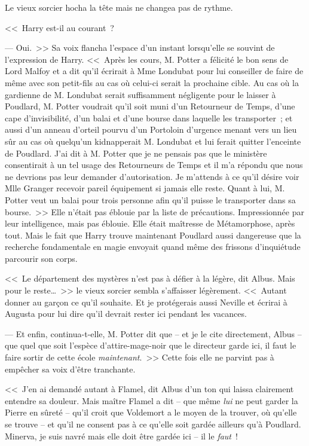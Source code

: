 Le vieux sorcier hocha la tête mais ne changea pas de rythme.

<<~Harry est-il au courant~?

--- Oui.~>> Sa voix flancha l'espace d'un instant lorsqu'elle se souvint de l'expression de Harry. <<~Après les cours, M. Potter a félicité le bon sens de Lord Malfoy et a dit qu'il écrirait à Mme Londubat pour lui conseiller de faire de même avec son petit-fils au cas où celui-ci serait la prochaine cible. Au cas où la gardienne de M. Londubat serait suffisamment négligente pour le laisser à Poudlard, M. Potter voudrait qu'il soit muni d'un Retourneur de Temps, d'une cape d'invisibilité, d'un balai et d'une bourse dans laquelle les transporter~; et aussi d'un anneau d'orteil pourvu d'un Portoloin d'urgence menant vers un lieu sûr au cas où quelqu'un kidnapperait M. Londubat et lui ferait quitter l'enceinte de Poudlard. J'ai dit à M. Potter que je ne pensais pas que le ministère consentirait à un tel usage des Retourneurs de Temps et il m'a répondu que nous ne devrions pas leur demander d'autorisation. Je m'attends à ce qu'il désire voir Mlle Granger recevoir pareil équipement si jamais elle reste. Quant à lui, M. Potter veut un balai pour trois personne afin qu'il puisse le transporter dans sa bourse.~>> Elle n'était pas éblouie par la liste de précautions. Impressionnée par leur intelligence, mais pas éblouie. Elle était maîtresse de Métamorphose, après tout. Mais le fait que Harry trouve maintenant Poudlard aussi dangereuse que la recherche fondamentale en magie envoyait quand même des frissons d'inquiétude parcourir son corps.

<<~Le département des mystères n'est pas à défier à la légère, dit Albus. Mais pour le reste…~>> le vieux sorcier sembla s'affaisser légèrement. <<~Autant donner au garçon ce qu'il souhaite. Et je protégerais aussi Neville et écrirai à Augusta pour lui dire qu'il devrait rester ici pendant les vacances.

--- Et enfin, continua-t-elle, M. Potter dit que -- et je le cite directement, Albus -- que quel que soit l'espèce d'attire-mage-noir que le directeur garde ici, il faut le faire sortir de cette école \emph{maintenant}.~>> Cette fois elle ne parvint pas à empêcher sa voix d'être tranchante.

<<~J'en ai demandé autant à Flamel, dit Albus d'un ton qui laissa clairement entendre sa douleur. Mais maître Flamel a dit -- que même \emph{lui} ne peut garder la Pierre en sûreté -- qu'il croit que Voldemort a le moyen de la trouver, où qu'elle se trouve -- et qu'il ne consent pas à ce qu'elle soit gardée ailleurs qu'à Poudlard. Minerva, je suis navré mais elle doit être gardée ici -- il le \emph{faut}~!

